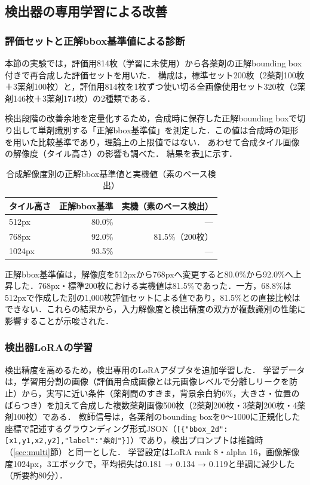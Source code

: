 \documentclass[dvipdfmx]{jsarticle}
\begin{document}
\subsection{検出器の専用学習による改善}\label{sec:detector}

\subsubsection{評価セットと正解bbox基準値による診断}

本節の実験では，評価用814枚（学習に未使用）から各薬剤の正解bounding box付きで再合成した評価セットを用いた．
構成は，標準セット200枚（2薬剤100枚＋3薬剤100枚）と，評価用814枚を1枚ずつ使い切る全画像使用セット320枚（2薬剤146枚＋3薬剤174枚）の2種類である．

検出段階の改善余地を定量化するため，合成時に保存した正解bounding boxで切り出して単剤識別する「正解bbox基準値」を測定した．この値は合成時の矩形を用いた比較基準であり，理論上の上限値ではない．
あわせて合成タイル画像の解像度（タイル高さ）の影響も調べた．
結果を表\ref{tab:a0}に示す．

\begin{table}[htbp]
\centering
\caption{合成解像度別の正解bbox基準値と実機値（素のベース検出）}
\label{tab:a0}
\begin{tabular}{lrr}
\hline
タイル高さ & 正解bbox基準 & 実機（素のベース検出） \\
\hline
512px & 80.0\% & --- \\
768px & 92.0\% & 81.5\%（200枚） \\
1024px & 93.5\% & --- \\
\hline
\end{tabular}
\end{table}

正解bbox基準値は，解像度を512pxから768pxへ変更すると80.0\%から92.0\%へ上昇した．768px・標準200枚における実機値は81.5\%であった．一方，68.8\%は512pxで作成した別の1,000枚評価セットによる値であり，81.5\%との直接比較はできない．これらの結果から，入力解像度と検出精度の双方が複数識別の性能に影響することが示唆された．

\subsubsection{検出器LoRAの学習}

検出精度を高めるため，検出専用のLoRAアダプタを追加学習した．
学習データは，学習用分割の画像（評価用合成画像とは元画像レベルで分離しリークを防止）から，実写に近い条件（薬剤間のすきま，背景余白約6\%，大きさ・位置のばらつき）を加えて合成した複数薬剤画像500枚（2薬剤200枚・3薬剤200枚・4薬剤100枚）である．
教師信号は，各薬剤のbounding boxを0〜1000に正規化した座標で記述するグラウンディング形式JSON（\texttt{[\{"bbox\_2d":[x1,y1,x2,y2],"label":"薬剤"\}]}）であり，検出プロンプトは推論時（\ref{sec:multi}節）と同一とした．
学習設定はLoRA rank 8・alpha 16，画像解像度1024px，3エポックで，平均損失は0.181 → 0.134 → 0.119と単調に減少した（所要約80分）．
\end{document}
